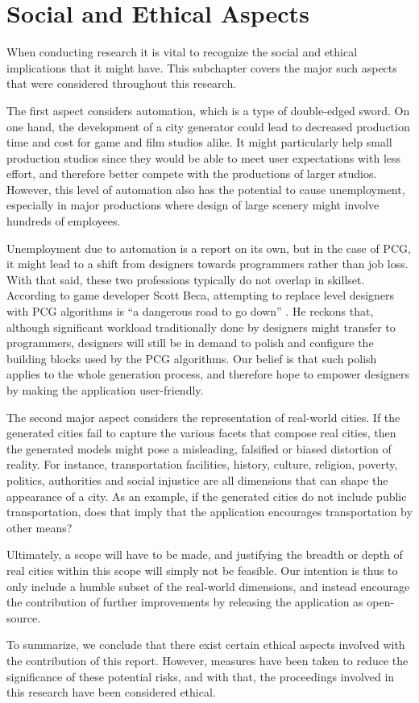 \section{Social and Ethical Aspects}

When conducting research it is vital to recognize the social and ethical implications that it might have.
This subchapter covers the major such aspects that were considered throughout this research.

The first aspect considers automation, which is a type of double-edged sword.
On one hand, the development of a city generator could lead to decreased production time and cost for game and film studios alike.
It might particularly help small production studios since they would be able to meet user expectations with less effort, and therefore better compete with the productions of larger studios.
However, this level of automation also has the potential to cause unemployment, especially in major productions where design of large scenery might involve hundreds of employees.

Unemployment due to automation is a report on its own, but in the case of PCG, it might lead to a shift from designers towards programmers rather than job loss.
With that said, these two professions typically do not overlap in skillset.
According to game developer Scott Beca, attempting to replace level designers with PCG algorithms is ``a dangerous road to go down'' \cite{gamasutra}.
He reckons that, although significant workload traditionally done by designers might transfer to programmers, designers will still be in demand to polish and configure the building blocks used by the PCG algorithms.
Our belief is that such polish applies to the whole generation process, and therefore hope to empower designers by making the application user-friendly.

The second major aspect considers the representation of real-world cities.
If the generated cities fail to capture the various facets that compose real cities, then the generated models might pose a misleading, falsified or biased distortion of reality.
For instance, transportation facilities, history, culture, religion, poverty, politics, authorities and social injustice are all dimensions that can shape the appearance of a city.
As an example, if the generated cities do not include public transportation, does that imply that the application encourages transportation by other means?

Ultimately, a scope will have to be made, and justifying the breadth or depth of real cities within this scope will simply not be feasible.
Our intention is thus to only include a humble subset of the real-world dimensions, and instead encourage the contribution of further improvements by releasing the application as open-source.

To summarize, we conclude that there exist certain ethical aspects involved with the contribution of this report.
However, measures have been taken to reduce the significance of these potential risks, and with that, the proceedings involved in this research have been considered ethical.

\newpage